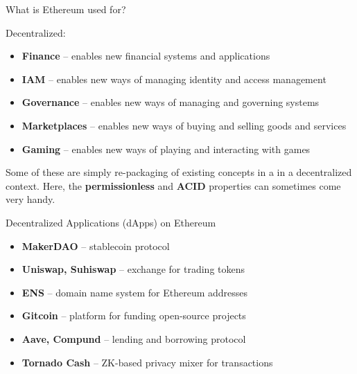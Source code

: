 \documentclass[aspectratio=169]{beamer}
\begin{document}
\begin{frame}{What is Ethereum used for?}

Decentralized:
\begin{itemize}
    \item \textbf{Finance} -- enables new financial systems and applications
    \item \textbf{IAM} -- enables new ways of managing identity and access management
    \item \textbf{Governance} -- enables new ways of managing and governing systems
    \item \textbf{Marketplaces} -- enables new ways of buying and selling goods and services
    \item \textbf{Gaming} -- enables new ways of playing and interacting with games
\end{itemize}
\bigskip

Some of these are simply re-packaging of existing concepts in a
in a decentralized context. Here, the \textbf{permissionless} and
\textbf{ACID} properties can sometimes come very handy.
\end{frame}

\begin{frame}{Decentralized Applications (dApps) on Ethereum}
\begin{itemize}
    \item \textbf{MakerDAO} -- stablecoin protocol
    \item \textbf{Uniswap, Suhiswap} -- exchange for trading tokens
    \item \textbf{ENS} -- domain name system for Ethereum addresses
    \item \textbf{Gitcoin} -- platform for funding open-source projects
    \item \textbf{Aave, Compund} -- lending and borrowing protocol
    \item \textbf{Tornado Cash} -- ZK-based privacy mixer for transactions
\end{itemize}
\end{frame}
\end{document}
